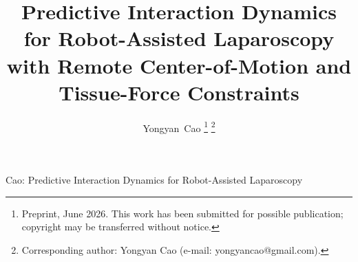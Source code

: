 \documentclass[journal]{IEEEtran}
\begin{document}
\title{Predictive Interaction Dynamics for Robot-Assisted Laparoscopy with Remote Center-of-Motion and Tissue-Force Constraints}

\author{Yongyan~Cao%
\thanks{Preprint, June 2026. This work has been submitted for possible publication; copyright may be transferred without notice.}%
\thanks{Corresponding author: Yongyan Cao (e-mail: yongyancao@gmail.com).}%
}

%
{Cao: Predictive Interaction Dynamics for Robot-Assisted Laparoscopy}

\maketitle


\end{document}
